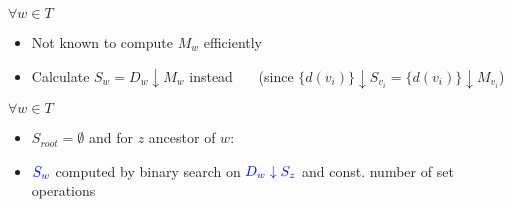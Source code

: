 \documentclass[18pt]{beamer}
\begin{document}
\begin{frame}
\begin{overprint}
\begin{itemize}
           	    \end{itemize}
                $\forall w \in T$
                \begin{itemize}
                	\item Not known to compute $M_w$ efficiently
                	\item Calculate $S_w = D_w \downarrow M_w$ instead \ \ \ ({\footnotesize since $\{d(v_i)\} \downarrow S_{v_i} = \{d(v{_i})\} \downarrow M_{v_i}$})
                \end{itemize}
            	$\forall w \in T$
            	\begin{itemize}
            		\item $S_{root} = \emptyset$ and for $z$ ancestor of $w$:
            		\item $\color{blue} S_w$ computed by binary search on $\color{blue} D_w \downarrow S_z$ and const. number of set operations
            	\end{itemize}
            \end{overprint}
		
\end{frame}
\end{document}
